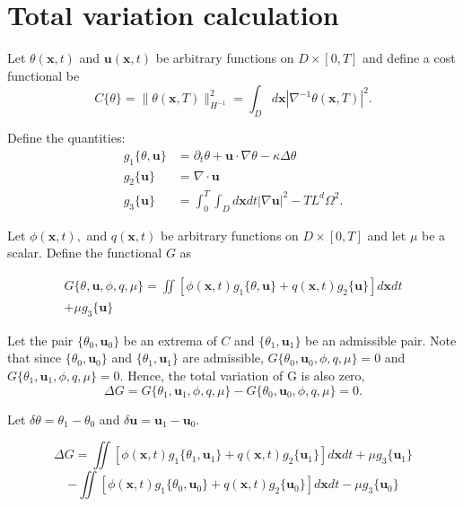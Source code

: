 
\section{Total variation calculation}
\label{sec:variation_calc}


\begin{flushleft}

Let $\theta(\mathbf{x},t)$ and $\mathbf{u}(\mathbf{x},t)$ be arbitrary functions on $D \times [0,T]$ and define a cost functional be
\[
C\{\theta\}=\| \theta(\mathbf{x},T)\|^{2}_{H^{-1}}=\int_{D}d\mathbf{x} |\nabla^{-1} \theta(\mathbf{x},T)|^{2}.\]

Define the quantities:
\begin{align*}
g_{1}\{\theta,\mathbf{u}\} &= \partial_{t}\theta+\mathbf{u}\cdot \nabla \theta - \kappa \Delta \theta \\
g_{2}\{\mathbf{u}\} &= \nabla\cdot \mathbf{u} \\
g_{3}\{\mathbf{u}\} &= \int_{0}^{T}\int_{D}d\mathbf{x}dt |\nabla \mathbf{u}|^{2}-TL^{d}\Omega^{2}.
\end{align*}

Let $\phi(\mathbf{x},t),$ and $ q(\mathbf{x},t)$ be arbitrary functions on $D \times [0,T]$ and let $\mu$ be a scalar. Define the functional $G$ as

\begin{eqnarray*}
G\{\theta,\mathbf{u},\phi,q,\mu\}=\iint [\phi(\mathbf{x},t) g_{1}\{\theta,\mathbf{u}\} + q(\mathbf{x},t) g_{2}\{\mathbf{u}\}]d\mathbf{x}dt\\
+\mu g_{3}\{\mathbf{u}\}
\end{eqnarray*}

Let the pair $\{\theta_{0},\mathbf{u}_{0}\}$ be an extrema of $C$ and $\{\theta_{1},\mathbf{u}_{1}\}$ be an admissible pair. Note that since $\{\theta_{0},\mathbf{u}_{0}\}$ and $\{\theta_{1},\mathbf{u}_{1}\}$ are admissible, $G\{\theta_{0},\mathbf{u}_{0},\phi,q,\mu\}=0$ and $G\{\theta_{1},\mathbf{u}_{1},\phi,q,\mu\}=0$. Hence, the total variation of G is also zero,
\[\Delta G= G\{\theta_{1},\mathbf{u}_{1},\phi,q,\mu\}-G\{\theta_{0},\mathbf{u}_{0},\phi,q,\mu\}=0.\]


 Let $\delta\theta=\theta_{1}-\theta_{0}$ and $\delta \mathbf{u}=\mathbf{u}_{1}-\mathbf{u}_{0}$.
 
 \[\Delta G=\iint [\phi(\mathbf{x},t) g_{1}\{\theta_{1},\mathbf{u}_{1}\} + q(\mathbf{x},t) g_{2}\{\mathbf{u}_{1}\}]d\mathbf{x}dt+\mu g_{3}\{\mathbf{u}_{1}\}\]
  \[-\iint [\phi(\mathbf{x},t) g_{1}\{\theta_{0},\mathbf{u}_{0}\} + q(\mathbf{x},t) g_{2}\{\mathbf{u}_{0}\}]d\mathbf{x}dt-\mu g_{3}\{\mathbf{u}_{0}\}\]
  

\end{flushleft}
